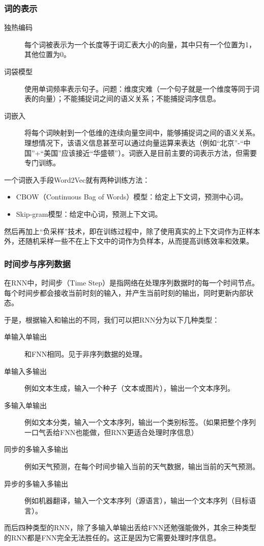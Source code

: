 \documentclass[aspectratio=1610]{ctexbeamer}
\begin{document}
\begin{frame}
    \frametitle{词的表示}

    \begin{description}
        \item[独热编码] 每个词被表示为一个长度等于词汇表大小的向量，其中只有一个位置为1，其他位置为0。
        \item[词袋模型] 使用单词频率表示句子。问题：维度灾难（一个句子就是一个维度等同于词表的向量）；不能捕捉词之间的语义关系；不能捕捉词序信息。
        \item[词嵌入] 将每个词映射到一个低维的连续向量空间中，能够捕捉词之间的语义关系。理想情况下，该语义信息甚至可以通过向量运算来表达（例如“北京”-“中国”+“美国”应该接近“华盛顿”）。词嵌入是目前主要的词表示方法，但需要专门训练。
    \end{description}

    一个词嵌入手段Word2Vec就有两种训练方法：
    \begin{itemize}
        \item CBOW（Continuous Bag of Words）模型：给定上下文词，预测中心词。
        \item Skip-gram模型：给定中心词，预测上下文词。
    \end{itemize}
    然后再加上“负采样”技术，即在训练过程中，除了使用真实的上下文词作为正样本外，还随机采样一些不在上下文中的词作为负样本，从而提高训练效率和效果。

\end{frame}

\begin{frame}
    \frametitle{时间步与序列数据}

    在RNN中，时间步（Time Step）是指网络在处理序列数据时的每一个时间节点。每个时间步都会接收当前时刻的输入，并产生当前时刻的输出，同时更新内部状态。

    于是，根据输入和输出的不同，我们可以把RNN分为以下几种类型：
    \begin{description}
        \item[单输入单输出] 和FNN相同。见于非序列数据的处理。
        \item[单输入多输出] 例如文本生成，输入一个种子（文本或图片），输出一个文本序列。
        \item[多输入单输出] 例如文本分类，输入一个文本序列，输出一个类别标签。（如果把整个序列一口气丢给FNN也能做，但RNN更适合处理时序信息）
        \item[同步的多输入多输出] 例如天气预测，在每个时间步输入当前的天气数据，输出当前的天气预测。
        \item[异步的多输入多输出] 例如机器翻译，输入一个文本序列（源语言），输出一个文本序列（目标语言）。
    \end{description}
    而后四种类型的RNN，除了多输入单输出丢给FNN还勉强能做外，其余三种类型的RNN都是FNN完全无法胜任的。这正是因为它需要处理时序信息。
\end{frame}
\end{document}
